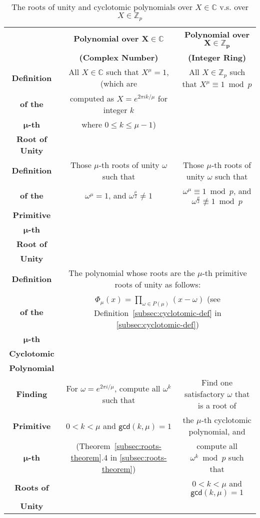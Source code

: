 \begin{table}[h] %
\begin{tabular}{|c||c||c|}
\hline \hline
& \textbf{Polynomial over $\bm{X} \bm{\in} \bm{\mathbb{C}}$} & \textbf{Polynomial over $\bm{X} \in \bm{\mathbb{Z}}_{\bm{p}}$} \\ 
& \textbf{(Complex Number)} & \textbf{(Integer Ring)} \\ \hline \hline
\textbf{Definition}&All $X \in \mathbb{C}$ such that $X^\mu = 1$, (which are&All $X \in \mathbb{Z}_p$ such that $X^\mu \equiv 1 \bmod p$\\
\textbf{of the}&computed as $X = e^{2 \pi i k / \mu}$ for integer $k$&\\
\textbf{$\bm \mu$-th}&where $0 \leq k \leq \mu - 1$)&\\
\textbf{Root of Unity}&&\\\hline
\textbf{Definition}&Those $\mu$-th roots of unity $\omega$ such that&Those $\mu$-th roots of unity $\omega$ such that\\
\textbf{of the}&$\omega^{\mu} = 1$, and $\omega^{\frac{\mu}{2}} \neq 1$&$\omega^{\mu} \equiv 1 \bmod p$, and $\omega^{\frac{\mu}{2}} \not\equiv 1 \bmod p$\\
\textbf{Primitive}&&\\
\textbf{$\bm \mu$-th}&&\\
\textbf{Root of}&&\\
\textbf{Unity}&&\\\hline
\textbf{Definition}&\multicolumn{2}{|c|}{The polynomial whose roots are the $\mu$-th primitive roots of unity as follows:}\\
\textbf{of the}&\multicolumn{2}{|c|}{$ \Phi_{\mu}(x) = \prod_{\omega \in P(\mu)} (x - \omega) $  \text{ } (see Definition~\ref*{subsec:cyclotomic-def} in \autoref{subsec:cyclotomic-def})}\\
\textbf{$\bm \mu$-th}&\multicolumn{2}{|c|}{}\\
\textbf{Cyclotomic}&\multicolumn{2}{|c|}{}\\
\textbf{Polynomial}&\multicolumn{2}{|c|}{}\\\hline
\textbf{Finding}&For $\omega = e^{2 \pi i/ \mu}$, compute all ${\omega}^k$ such that&Find one satisfactory $\omega$ that is a root of\\
\textbf{Primitive}&$0 < k < \mu $ and $\textsf{gcd}(k, \mu) = 1$&the $\mu$-th cyclotomic polynomial, and\\
\textbf{$\bm \mu$-th}&(Theorem~\ref*{subsec:roots-theorem}.4 in \autoref{subsec:roots-theorem})&compute all $\omega^k \bmod p$ such that\\
\textbf{Roots of}&&$0 < k < \mu $ and $\textsf{gcd}(k, \mu) = 1$\\
\textbf{Unity}&&\\\hline\hline
\end{tabular}
\caption{The roots of unity and cyclotomic polynomials over $X \in \mathbb{C}$ v.s. over $X \in \mathbb{Z}_p$}
\label{tab:cyclotomic-polynomial-comparison}
\end{table}


